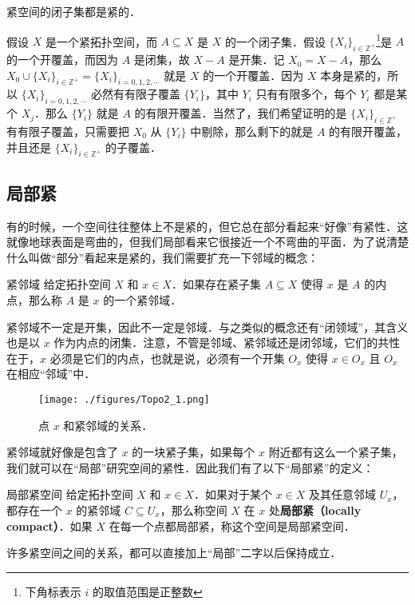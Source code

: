 \begin{theorem}{}\label{Topo2_the2}
紧空间的闭子集都是紧的．
\end{theorem}

假设 $X$ 是一个紧拓扑空间，而 $A\subseteq X$ 是 $X$ 的一个闭子集．假设 $\{X_i\}_{i\in \mathbb{Z}^+}$\footnote{下角标表示 $i$ 的取值范围是正整数}是 $A$ 的一个开覆盖，而因为 $A$ 是闭集，故 $X-A$ 是开集．记 $X_0=X-A$，那么 $X_0\cup\{X_i\}_{i\in \mathbb{Z}^+}=\{X_i\}_{i=0, 1, 2, \cdots}$ 就是 $X$ 的一个开覆盖．因为 $X$ 本身是紧的，所以 $\{X_i\}_{i=0, 1, 2, \cdots}$ 必然有有限子覆盖 $\{Y_i\}$，其中 $Y_i$ 只有有限多个，每个 $Y_i$ 都是某个 $X_j$．那么 $\{Y_i\}$ 就是 $A$ 的有限开覆盖．当然了，我们希望证明的是 $\{X_i\}_{i\in \mathbb{Z}^+}$ 有有限子覆盖，只需要把 $X_0$ 从 $\{Y_i\}$ 中剔除，那么剩下的就是 $A$ 的有限开覆盖，并且还是 $\{X_i\}_{i\in \mathbb{Z}^+}$ 的子覆盖．

\subsection{局部紧}

有的时候，一个空间往往整体上不是紧的，但它总在部分看起来“好像”有紧性．这就像地球表面是弯曲的，但我们局部看来它很接近一个不弯曲的平面．为了说清楚什么叫做“部分”看起来是紧的，我们需要扩充一下邻域的概念：

\begin{definition}{紧邻域}
给定拓扑空间 $X$ 和 $x\in X$．如果存在紧子集 $A\subseteq X$ 使得 $x$ 是 $A$ 的内点，那么称 $A$ 是 $x$ 的一个紧邻域．
\end{definition}

紧邻域不一定是开集，因此不一定是邻域．与之类似的概念还有“闭领域”，其含义也是以 $x$ 作为内点的闭集．注意，不管是邻域、紧邻域还是闭邻域，它们的共性在于，$x$ 必须是它们的内点，也就是说，必须有一个开集 $O_x$ 使得 $x\in O_x$ 且 $O_x$ 在相应“邻域”中．

\begin{figure}[ht]
\centering
\texttt{[image: ./figures/Topo2\_1.png]}
\caption{点 $x$ 和紧邻域的关系．} \label{Topo2_fig1}
\end{figure}

紧邻域就好像是包含了 $x$ 的一块紧子集，如果每个 $x$ 附近都有这么一个紧子集，我们就可以在“局部”研究空间的紧性．因此我们有了以下“局部紧”的定义：

\begin{definition}{局部紧空间}
给定拓扑空间 $X$ 和 $x\in X$．如果对于某个 $x\in X$ 及其任意邻域 $U_x$，都存在一个 $x$ 的紧邻域 $C\subseteq U_x$，那么称空间 $X$ 在 $x$ 处\textbf{局部紧（locally compact）}．如果 $X$ 在每一个点都局部紧，称这个空间是局部紧空间．
\end{definition}

许多紧空间之间的关系，都可以直接加上“局部”二字以后保持成立．